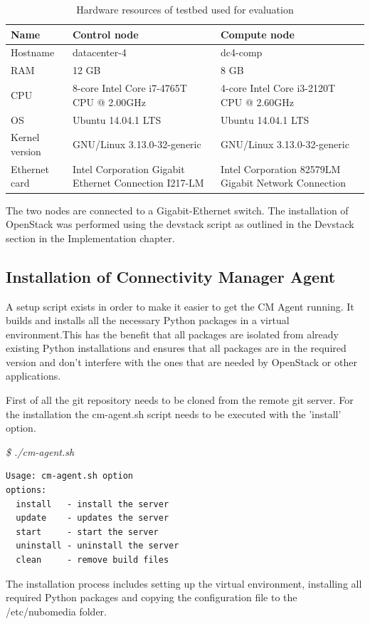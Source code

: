 \begin{table}[H]
\centering

\begin{tabularx}{\textwidth}{ |X|X|X| }
\hline Name & \textbf{Control node} & \textbf{Compute node} \\ 
\hline Hostname & datacenter-4 & dc4-comp \\ 
\hline RAM & 12 GB & 8 GB \\ 
\hline CPU & 8-core Intel Core i7-4765T CPU @ 2.00GHz & 4-core Intel Core i3-2120T CPU @ 2.60GHz \\ 
\hline OS & Ubuntu 14.04.1 LTS & Ubuntu 14.04.1 LTS \\ 
\hline Kernel version & GNU/Linux 3.13.0-32-generic & GNU/Linux 3.13.0-32-generic \\
\hline Ethernet card & Intel Corporation Gigabit Ethernet Connection I217-LM & Intel Corporation 82579LM Gigabit Network Connection \\ 
\hline 
\end{tabularx}

\caption{Hardware resources of testbed used for evaluation}
\end{table}


The two nodes are connected to a Gigabit-Ethernet switch. The installation of OpenStack was performed using the devstack script as outlined in the Devstack section in the Implementation chapter.

\subsection{Installation of Connectivity Manager Agent}

A setup script exists in order to make it easier to get the CM Agent running. It builds and installs all the necessary Python packages in a virtual environment.This has the benefit that all packages are isolated from already existing Python installations and ensures that all packages are in the required version and don't interfere with the ones that are needed by OpenStack or other applications. 

First of all the git repository needs to be cloned from the remote git server. For the installation the cm-agent.sh script needs to be executed with the 'install' option.

\textit{\$ ./cm-agent.sh}
\begin{lstlisting}
Usage: cm-agent.sh option
options:
  install   - install the server
  update    - updates the server
  start     - start the server
  uninstall - uninstall the server
  clean     - remove build files
\end{lstlisting}
The installation process includes setting up the virtual environment, installing all required Python packages and copying the configuration file to the /etc/nubomedia folder.

